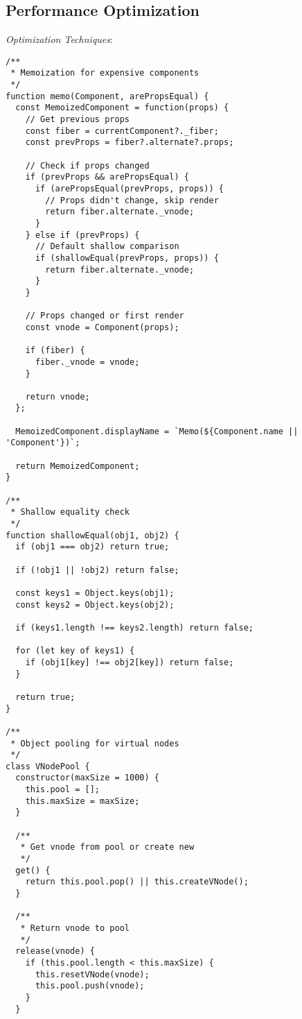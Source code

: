 \documentclass[11pt]{article}
\begin{document}
\subsection{Performance Optimization}
\label{sec:orga1e2a4d}

\emph{Optimization Techniques}:

\begin{verbatim}
/**
 * Memoization for expensive components
 */
function memo(Component, arePropsEqual) {
  const MemoizedComponent = function(props) {
    // Get previous props
    const fiber = currentComponent?._fiber;
    const prevProps = fiber?.alternate?.props;
    
    // Check if props changed
    if (prevProps && arePropsEqual) {
      if (arePropsEqual(prevProps, props)) {
        // Props didn't change, skip render
        return fiber.alternate._vnode;
      }
    } else if (prevProps) {
      // Default shallow comparison
      if (shallowEqual(prevProps, props)) {
        return fiber.alternate._vnode;
      }
    }
    
    // Props changed or first render
    const vnode = Component(props);
    
    if (fiber) {
      fiber._vnode = vnode;
    }
    
    return vnode;
  };
  
  MemoizedComponent.displayName = `Memo(${Component.name || 'Component'})`;
  
  return MemoizedComponent;
}

/**
 * Shallow equality check
 */
function shallowEqual(obj1, obj2) {
  if (obj1 === obj2) return true;
  
  if (!obj1 || !obj2) return false;
  
  const keys1 = Object.keys(obj1);
  const keys2 = Object.keys(obj2);
  
  if (keys1.length !== keys2.length) return false;
  
  for (let key of keys1) {
    if (obj1[key] !== obj2[key]) return false;
  }
  
  return true;
}

/**
 * Object pooling for virtual nodes
 */
class VNodePool {
  constructor(maxSize = 1000) {
    this.pool = [];
    this.maxSize = maxSize;
  }
  
  /**
   * Get vnode from pool or create new
   */
  get() {
    return this.pool.pop() || this.createVNode();
  }
  
  /**
   * Return vnode to pool
   */
  release(vnode) {
    if (this.pool.length < this.maxSize) {
      this.resetVNode(vnode);
      this.pool.push(vnode);
    }
  }
  

\end{verbatim}
\end{document}
